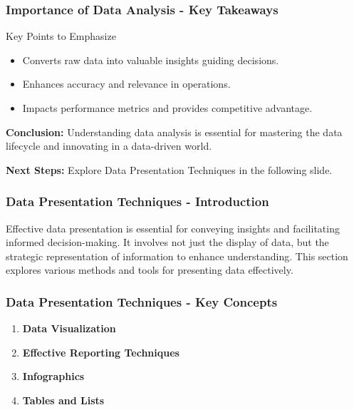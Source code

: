 \documentclass[aspectratio=169]{beamer}
\begin{document}
\begin{frame}[fragile]
    \frametitle{Importance of Data Analysis - Key Takeaways}
    
    \begin{block}{Key Points to Emphasize}
        \begin{itemize}
            \item Converts raw data into valuable insights guiding decisions.
            \item Enhances accuracy and relevance in operations.
            \item Impacts performance metrics and provides competitive advantage.
        \end{itemize}
    \end{block}
    
    \textbf{Conclusion:}
    Understanding data analysis is essential for mastering the data lifecycle and innovating in a data-driven world.
    
    \textbf{Next Steps:}
    Explore Data Presentation Techniques in the following slide.
\end{frame}

\begin{frame}[fragile]
    \frametitle{Data Presentation Techniques - Introduction}
    Effective data presentation is essential for conveying insights and facilitating informed decision-making. It involves not just the display of data, but the strategic representation of information to enhance understanding. This section explores various methods and tools for presenting data effectively.
\end{frame}

\begin{frame}[fragile]
    \frametitle{Data Presentation Techniques - Key Concepts}
    \begin{enumerate}
        \item \textbf{Data Visualization}
        \item \textbf{Effective Reporting Techniques}
        \item \textbf{Infographics}
        \item \textbf{Tables and Lists}
    \end{enumerate}
\end{frame}
\end{document}
